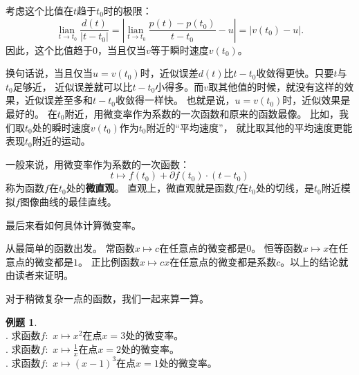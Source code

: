 \documentclass[12pt,UTF8]{ctexbook}
\newcommand{\lian}[1]{
    \underset{#1}{\operatorname{lian}\,}
}
\theoremstyle{definition}
\newtheorem{et}{例题}[section]
\theoremstyle{plain}
\begin{document}
考虑这个比值在$t$趋于$t_0$时的极限：
$$ \lian{t\to t_0} \frac{d(t)}{|t - t_0|} = \left|\lian{t\to t_0} \frac{p(t) - p(t_0)}{t -  t_0} - u\right| = |v(t_0) - u|. $$
因此，这个比值趋于$0$，当且仅当$v$等于瞬时速度$v(t_0)$。

换句话说，当且仅当$u = v(t_0)$时，近似误差$d(t)$比$t-t_0$收敛得更快。只要$t$与$t_0$足够近，
近似误差就可以比$t-t_0$小得多。而$v$取其他值的时候，就没有这样的效果，近似误差至多和$t-t_0$收敛得一样快。
也就是说，$u = v(t_0)$时，近似效果是最好的。
在$t_0$附近，用微变率作为系数的一次函数和原来的函数最像。
比如，我们取$t_0$处的瞬时速度$v(t_0)$作为$t_0$附近的“平均速度”，
就比取其他的平均速度更能表现$t_0$附近的运动。

一般来说，用微变率作为系数的一次函数：
$$ t \mapsto f(t_0) + \partial f(t_0) \cdot(t - t_0)$$
称为函数$f$在$t_0$处的\textbf{微直观}。
直观上，微直观就是函数$f$在$t_0$处的切线，是$t_0$附近模拟$f$图像曲线的最佳直线。

最后来看如何具体计算微变率。

从最简单的函数出发。
常函数$x \mapsto c$在任意点的微变都是$0$。
恒等函数$x\mapsto x$在任意点的微变都是$1$。
正比例函数$x \mapsto c x$在任意点的微变都是系数$c$。以上的结论就由读者来证明。

对于稍微复杂一点的函数，我们一起来算一算。

\begin{et}
    \mbox{} \\
    . 求函数$f: \,\, x \mapsto x^2$在点$x = 3$处的微变率。\\
    . 求函数$f: \,\, x \mapsto \frac{1}{x}$在点$x = 2$处的微变率。\\
    . 求函数$f: \,\, x \mapsto (x - 1)^3$在点$x = 1$处的微变率。
\end{et}
\end{document}
